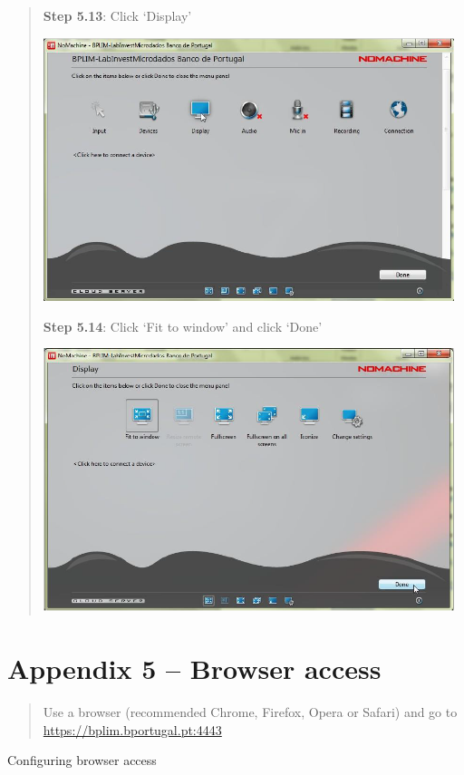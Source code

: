 \documentclass[]{book}
\begin{document}
\begin{quote}
\textbf{Step 5.13}: Click `Display'

\includegraphics[width=4.72441in,height=3.0268in]{./media/image39.png}

\textbf{Step 5.14}: Click `Fit to window' and click `Done'

\includegraphics[width=4.72441in,height=3.02195in]{./media/image40.png}
\end{quote}

\hypertarget{appendix-5-browser-access}{%
\section{\texorpdfstring{{Appendix 5 -- Browser access}}{Appendix 5 -- Browser access}}\label{appendix-5-browser-access}}

\begin{quote}
Use a browser (recommended Chrome, Firefox, Opera or Safari) and go to
\url{https://bplim.bportugal.pt:4443}
\end{quote}

Configuring browser access
\end{document}
